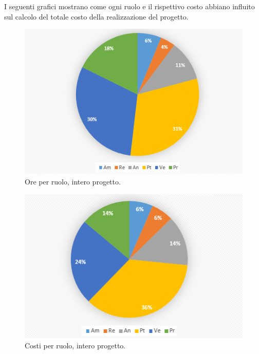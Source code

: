 \documentclass[a4paper]{article}
\begin{document}
				I seguenti grafici mostrano come ogni ruolo e il rispettivo costo abbiano influito sul calcolo del totale 
				costo della realizzazione del progetto.
				\begin{figure}[H]
					\centering
					\includegraphics[scale=0.7]{pc_totali}
					\caption{Ore per ruolo, intero progetto.}
				\end{figure}
				\begin{figure}[H]
					\centering
					\includegraphics[scale=0.7]{pc_costi_totali}
					\caption{Costi per ruolo, intero progetto.}
				\end{figure}
				
\end{document}
